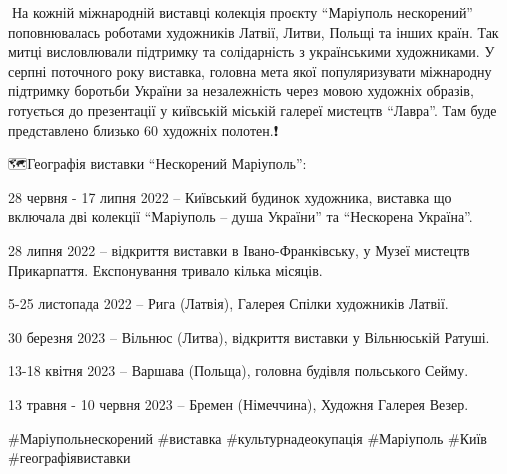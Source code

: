📍На кожній міжнародній виставці колекція проєкту \enquote{Маріуполь нескорений}
поповнювалась роботами художників Латвії, Литви, Польщі та інших країн. Так
митці висловлювали підтримку та солідарність з українськими художниками. У
серпні поточного року виставка, головна мета якої популяризувати міжнародну
підтримку боротьби України за незалежність через мовою художніх образів,
готується до презентації у київській міській галереї мистецтв \enquote{Лавра}. Там буде
представлено близько 60 художніх полотен.❗️

🗺Географія виставки \enquote{Нескорений Маріуполь}:

28 червня - 17 липня 2022 – Київський будинок художника, виставка що включала
дві колекції \enquote{Маріуполь – душа України} та \enquote{Нескорена Україна}.

28 липня 2022 – відкриття виставки в Івано-Франківську, у Музеї мистецтв
Прикарпаття. Експонування тривало кілька місяців.

5-25 листопада 2022 – Рига (Латвія), Галерея Спілки художників Латвії.

30 березня 2023 – Вільнюс (Литва), відкриття виставки у Вільнюській Ратуші.

13-18 квітня 2023 – Варшава (Польща), головна будівля польського Сейму.

13 травня - 10 червня 2023 – Бремен (Німеччина), Художня Галерея Везер.

\#Маріупольнескорений \#виставка \#культурнадеокупація \#Маріуполь \#Київ
\#географіявиставки
